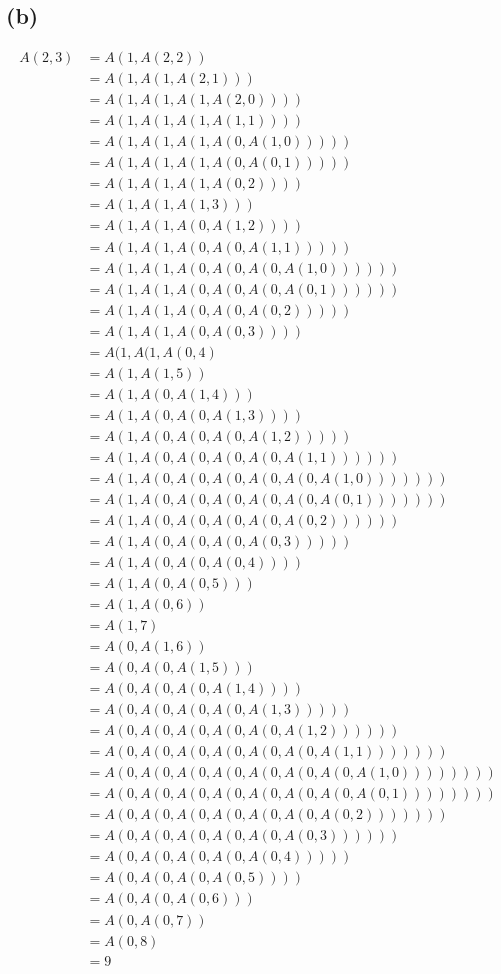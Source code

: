 \documentclass[a4paper,11pt]{article}
\begin{document}
\subsection*{(b)}
\begin{align*}
A(2,3) &= A(1,A(2,2)) \\
&= A(1,A(1,A(2,1))) \\
&= A(1,A(1,A(1,A(2,0)))) \\
&= A(1,A(1,A(1,A(1,1)))) \\
&= A(1,A(1,A(1,A(0,A(1,0))))) \\
&= A(1,A(1,A(1,A(0,A(0,1))))) \\
&= A(1,A(1,A(1,A(0,2)))) \\
&= A(1,A(1,A(1,3))) \\
&= A(1,A(1,A(0,A(1,2)))) \\
&= A(1,A(1,A(0,A(0,A(1,1))))) \\
&= A(1,A(1,A(0,A(0,A(0,A(1,0)))))) \\
&= A(1,A(1,A(0,A(0,A(0,A(0,1)))))) \\
&= A(1,A(1,A(0,A(0,A(0,2))))) \\
&= A(1,A(1,A(0,A(0,3)))) \\
&= A(1,A(1,A(0,4) \\
&= A(1,A(1,5)) \\
&= A(1,A(0,A(1,4))) \\
&= A(1,A(0,A(0,A(1,3)))) \\
&= A(1,A(0,A(0,A(0,A(1,2))))) \\
&= A(1,A(0,A(0,A(0,A(0,A(1,1)))))) \\
&= A(1,A(0,A(0,A(0,A(0,A(0,A(1,0))))))) \\
&= A(1,A(0,A(0,A(0,A(0,A(0,A(0,1))))))) \\
&= A(1,A(0,A(0,A(0,A(0,A(0,2)))))) \\
&= A(1,A(0,A(0,A(0,A(0,3))))) \\
&= A(1,A(0,A(0,A(0,4)))) \\
&= A(1,A(0,A(0,5))) \\
&= A(1,A(0,6)) \\
&= A(1,7) \\
&= A(0,A(1,6)) \\
&= A(0,A(0,A(1,5))) \\
&= A(0,A(0,A(0,A(1,4)))) \\
&= A(0,A(0,A(0,A(0,A(1,3))))) \\
&= A(0,A(0,A(0,A(0,A(0,A(1,2)))))) \\
&= A(0,A(0,A(0,A(0,A(0,A(0,A(1,1))))))) \\
&= A(0,A(0,A(0,A(0,A(0,A(0,A(0,A(1,0)))))))) \\
&= A(0,A(0,A(0,A(0,A(0,A(0,A(0,A(0,1)))))))) \\
&= A(0,A(0,A(0,A(0,A(0,A(0,A(0,2))))))) \\
&= A(0,A(0,A(0,A(0,A(0,A(0,3)))))) \\
&= A(0,A(0,A(0,A(0,A(0,4))))) \\
&= A(0,A(0,A(0,A(0,5)))) \\
&= A(0,A(0,A(0,6))) \\
&= A(0,A(0,7)) \\
&= A(0,8) \\
&= 9
\end{align*}
\end{document}
